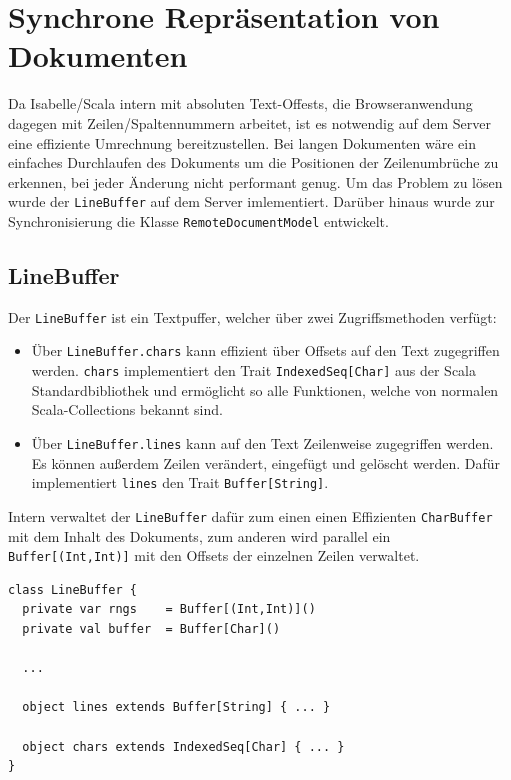 \clearpage

\section{Synchrone Repräsentation von Dokumenten}
\label{sec:linebuffer}

Da Isabelle/Scala intern mit absoluten Text-Offests, die Browseranwendung dagegen mit
Zeilen/Spaltennummern arbeitet, ist es notwendig auf dem Server eine effiziente Umrechnung
bereitzustellen. Bei langen Dokumenten wäre ein einfaches Durchlaufen des Dokuments um die
Positionen der Zeilenumbrüche zu erkennen, bei jeder Änderung nicht performant genug. Um das Problem
zu lösen wurde der \texttt{LineBuffer} auf dem Server imlementiert. Darüber hinaus wurde zur
Synchronisierung die Klasse \texttt{RemoteDocumentModel} entwickelt.

\subsection{LineBuffer}

Der \texttt{LineBuffer} ist ein Textpuffer, welcher über zwei Zugriffsmethoden verfügt:

\begin{itemize}
  \item Über \texttt{LineBuffer.chars} kann effizient über Offsets auf den Text zugegriffen werden. 
  \texttt{chars} implementiert den Trait \texttt{IndexedSeq[Char]} aus der Scala Standardbibliothek
  und ermöglicht so alle Funktionen, welche von normalen Scala-Collections bekannt sind.
  \item Über \texttt{LineBuffer.lines} kann auf den Text Zeilenweise zugegriffen werden. Es können 
  außerdem Zeilen verändert, eingefügt und gelöscht werden. Dafür implementiert \texttt{lines} den 
  Trait \texttt{Buffer[String]}.
\end{itemize}

Intern verwaltet der \texttt{LineBuffer} dafür zum einen einen Effizienten \texttt{CharBuffer} mit
dem Inhalt des Dokuments, zum anderen wird parallel ein \texttt{Buffer[(Int,Int)]} mit den Offsets
der einzelnen Zeilen verwaltet.

\begin{lstlisting}
class LineBuffer {
  private var rngs    = Buffer[(Int,Int)]()  
  private val buffer  = Buffer[Char]()     

  ...
    
  object lines extends Buffer[String] { ... } 
  
  object chars extends IndexedSeq[Char] { ... } 
}
\end{lstlisting}

